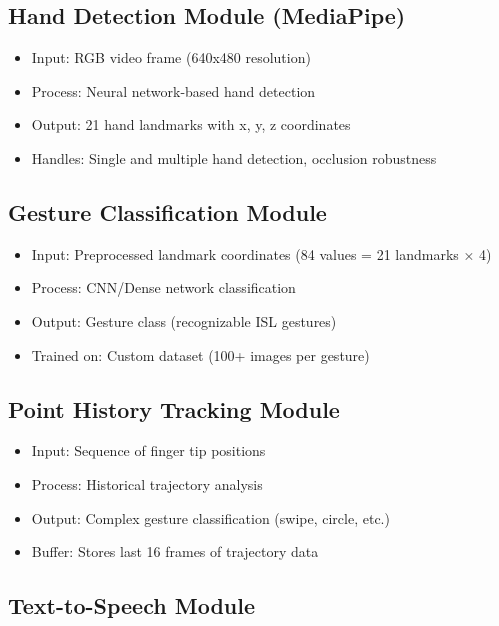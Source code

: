 \subsection{Hand Detection Module (MediaPipe)}

\begin{itemize}
    \item Input: RGB video frame (640x480 resolution)
    \item Process: Neural network-based hand detection
    \item Output: 21 hand landmarks with x, y, z coordinates
    \item Handles: Single and multiple hand detection, occlusion robustness
\end{itemize}

\subsection{Gesture Classification Module}

\begin{itemize}
    \item Input: Preprocessed landmark coordinates (84 values = 21 landmarks × 4)
    \item Process: CNN/Dense network classification
    \item Output: Gesture class (recognizable ISL gestures)
    \item Trained on: Custom dataset (100+ images per gesture)
\end{itemize}

\subsection{Point History Tracking Module}

\begin{itemize}
    \item Input: Sequence of finger tip positions
    \item Process: Historical trajectory analysis
    \item Output: Complex gesture classification (swipe, circle, etc.)
    \item Buffer: Stores last 16 frames of trajectory data
\end{itemize}

\subsection{Text-to-Speech Module}

